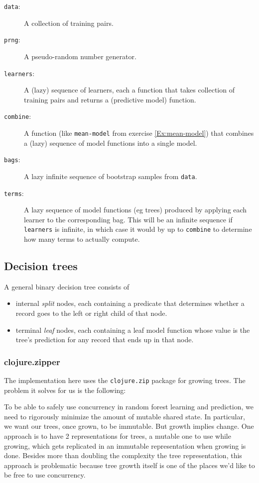 \documentclass[10pt,openany]{article}
\numberwithin{definition}{section}
\numberwithin{example}{section}
\numberwithin{equation}{section}
\numberwithin{figure}{section}
\begin{document}
\begin{description}
\item [{\texttt{data}:}] A collection of training pairs.
\item [{\texttt{prng}:}] A pseudo-random number generator.
\item [{\texttt{learners}:}] A (lazy) sequence of learners, each a function
that takes collection of training pairs and returns a (predictive
model) function.
\item [{\texttt{combine}:}] A function (like \texttt{mean-model} from exercise
\ref{Ex:mean-model}) that combines a (lazy) sequence of model functions
into a single model.
\item [{\texttt{bags}:}] A lazy infinite sequence of bootstrap samples
from \texttt{data}.
\item [{\texttt{terms}:}] A lazy sequence of model functions (eg trees)
produced by applying each learner to the corresponding bag. This will
be an infinite sequence if \texttt{learners} is infinite, in which
case it would by up to \texttt{combine} to determine how many terms
to actually compute. \end{description}

\subsection{\label{sub:Decision-trees}Decision trees}

A general binary decision tree consists of 
\begin{itemize}
\item internal \emph{split} nodes, each containing a predicate that determines
whether a record goes to the left or right child of that node.
\item terminal \emph{leaf} nodes, each containing a leaf model function
whose value is the tree's prediction for any record that ends up in
that node. 
\end{itemize}

\subsubsection{clojure.zipper}

The implementation here uses the \texttt{clojure.zip} package for
growing trees. The problem it solves for us is the following: 

To be able to safely use concurrency in random forest learning and
prediction, we need to rigorously minimize the amount of mutable shared
state. In particular, we want our trees, once grown, to be immutable.
But growth implies change. One approach is to have 2 representations
for trees, a mutable one to use while growing, which gets replicated
in an immutable representation when growing is done. Besides more
than doubling the complexity the tree representation, this approach
is problematic because tree growth itself is one of the places we'd
like to be free to use concurrency. 
\end{document}
